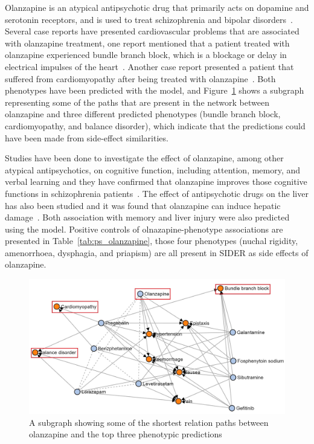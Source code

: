 Olanzapine is an atypical antipsychotic drug that primarily acts on dopamine and serotonin receptors, and is used to treat schizophrenia and bipolar disorders~\cite{thomas_olanzapine_2019}.
Several case reports have presented cardiovascular problems that are associated with olanzapine treatment, one report mentioned that a patient treated with olanzapine experienced bundle branch block, which is a blockage or delay in electrical impulses of the heart~\cite{ninan_case_2017}.
Another case report presented a patient that suffered from cardiomyopathy after being treated with olanzapine~\cite{puttegowda_olanzapine_2016}.
Both phenotypes have been predicted with the model, and Figure~\ref{fig:olanzapine_phenotypes} shows a subgraph representing some of the paths that are present in the network between olanzapine and three different predicted phenotypes (bundle branch block, cardiomyopathy, and balance disorder), which indicate that the predictions could have been made from side-effect similarities.

Studies have been done to investigate the effect of olanzapine, among other atypical antipsychotics, on cognitive function, including attention, memory, and verbal learning and they have confirmed that olanzapine improves those cognitive functions in schizophrenia patients~\cite{mcgurk_cognitive_2004, smith_effects_2001, cuesta_effects_2001, purdon_neuropsychological_2000, bilder_neurocognitive_2002}.
The effect of antipsychotic drugs on the liver has also been studied and it was found that olanzapine can induce hepatic damage~\cite{lv_antipsychotic_2018}.
Both association with memory and liver injury were also predicted using the model.
Positive controls of olnazapine-phenotype associations are presented in Table~\ref{tab:ps_olanzapine}, those four phenotypes (nuchal rigidity, amenorrhoea, dysphagia, and priapism) are all present in \ac{SIDER} as side effects of olanzapine.

\begin{figure}[h!]
    \centering
    \includegraphics[scale=0.6]
    {figures/olanzapine_phenotypes.jpg}
    \caption[Olanzapine's path subgraph for all phenotypes]{\label{fig:olanzapine_phenotypes} A subgraph showing some of the shortest relation paths between olanzapine and the top three phenotypic predictions}
\end{figure}

